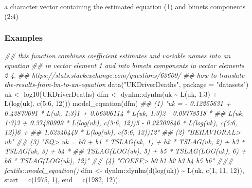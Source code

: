 \documentclass[
  letterpaper,
  DIV=11,
  numbers=noendperiod]{scrreport}
\newenvironment{Shaded}{\begin{snugshade}}{\end{snugshade}}
\newcommand{\AttributeTok}[1]{\textcolor[rgb]{0.40,0.45,0.13}{#1}}
\newcommand{\DecValTok}[1]{\textcolor[rgb]{0.68,0.00,0.00}{#1}}
\newcommand{\DocumentationTok}[1]{\textcolor[rgb]{0.37,0.37,0.37}{\textit{#1}}}
\newcommand{\FunctionTok}[1]{\textcolor[rgb]{0.28,0.35,0.67}{#1}}
\newcommand{\NormalTok}[1]{\textcolor[rgb]{0.00,0.23,0.31}{#1}}
\newcommand{\OtherTok}[1]{\textcolor[rgb]{0.00,0.23,0.31}{#1}}
\newcommand{\SpecialCharTok}[1]{\textcolor[rgb]{0.37,0.37,0.37}{#1}}
\newcommand{\StringTok}[1]{\textcolor[rgb]{0.13,0.47,0.30}{#1}}
\begin{document}
a character vector containing the estimated equation (1) and bimets
components (2:4)

\subsubsection{Examples}\label{examples-86}

\begin{Shaded}
\begin{Highlighting}[]
\DocumentationTok{\#\# this function combines coefficient estimates and variable names into an equation}
\DocumentationTok{\#\# in vector element 1 and into bimets components in vector elements 2{-}4.}
\DocumentationTok{\#\# https://stats.stackexchange.com/questions/63600/}
\DocumentationTok{\#\# how{-}to{-}translate{-}the{-}results{-}from{-}lm{-}to{-}an{-}equation}
\FunctionTok{data}\NormalTok{(}\StringTok{"UKDriverDeaths"}\NormalTok{, }\AttributeTok{package =} \StringTok{"datasets"}\NormalTok{)}
\NormalTok{uk }\OtherTok{\textless{}{-}} \FunctionTok{log10}\NormalTok{(UKDriverDeaths)}
\NormalTok{dfm }\OtherTok{\textless{}{-}}\NormalTok{ dynlm}\SpecialCharTok{::}\FunctionTok{dynlm}\NormalTok{(uk }\SpecialCharTok{\textasciitilde{}} \FunctionTok{L}\NormalTok{(uk, }\DecValTok{1}\SpecialCharTok{:}\DecValTok{3}\NormalTok{) }\SpecialCharTok{+} \FunctionTok{L}\NormalTok{(}\FunctionTok{log}\NormalTok{(uk), }\FunctionTok{c}\NormalTok{(}\DecValTok{5}\SpecialCharTok{:}\DecValTok{6}\NormalTok{, }\DecValTok{12}\NormalTok{)))}
\FunctionTok{model\_equation}\NormalTok{(dfm)}
\DocumentationTok{\#\# (1) "uk = {-} 0.12255631 + 0.42870091 * L(uk, 1:3)1 + 0.06306114 * L(uk, 1:3)2 {-} 0.09778518 *}
\DocumentationTok{\#\# L(uk, 1:3)3 + 0.37480999 * L(log(uk), c(5:6, 12))5 {-} 0.22709846 * L(log(uk), c(5:6, 12))6 +}
\DocumentationTok{\#\# 1.62340449 * L(log(uk), c(5:6, 12))12"}
\DocumentationTok{\#\# (2) "BEHAVIORAL\textgreater{} uk"}
\DocumentationTok{\#\# (3) "EQ\textgreater{} uk = b0 + b1 * TSLAG(uk, 1) + b2 * TSLAG(uk, 2) + b3 * TSLAG(uk, 3) + b4 *}
\DocumentationTok{\#\# TSLAG(LOG(uk), 5) + b5 * TSLAG(LOG(uk), 6) + b6 * TSLAG(LOG(uk), 12)"}
\DocumentationTok{\#\# (4) "COEFF\textgreater{} b0 b1 b2 b3 b4 b5 b6"}
\DocumentationTok{\#\#\# fcutils::model\_equation()}
\NormalTok{dfm }\OtherTok{\textless{}{-}}\NormalTok{ dynlm}\SpecialCharTok{::}\FunctionTok{dynlm}\NormalTok{(}\FunctionTok{d}\NormalTok{(}\FunctionTok{log}\NormalTok{(uk)) }\SpecialCharTok{\textasciitilde{}} \FunctionTok{L}\NormalTok{(uk, }\FunctionTok{c}\NormalTok{(}\DecValTok{1}\NormalTok{, }\DecValTok{11}\NormalTok{, }\DecValTok{12}\NormalTok{)), }\AttributeTok{start =} \FunctionTok{c}\NormalTok{(}\DecValTok{1975}\NormalTok{, }\DecValTok{1}\NormalTok{), }\AttributeTok{end =} \FunctionTok{c}\NormalTok{(}\DecValTok{1982}\NormalTok{, }\DecValTok{12}\NormalTok{))}

\end{Highlighting}
\end{Shaded}
\end{document}
